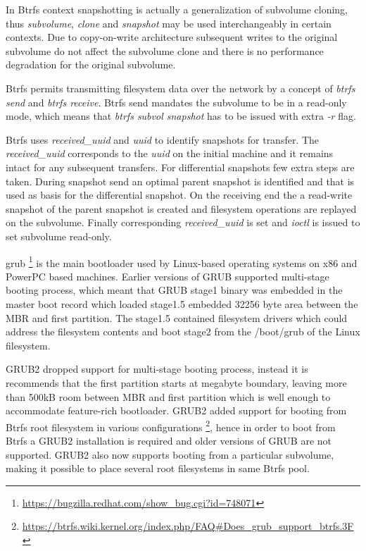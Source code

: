 \documentclass[a4paper,11pt]{kth-mag}
\begin{document}
In Btrfs context snapshotting is actually 
a generalization of subvolume cloning,
thus \emph{subvolume}, \emph{clone} and \emph{snapshot} may be used
interchangeably in certain contexts.
Due to copy-on-write architecture subsequent writes
to the original subvolume do not affect
the subvolume clone and there is no performance
degradation for the original subvolume.

Btrfs permits transmitting filesystem data over the network
by a concept of \emph{btrfs send} and \emph{btrfs receive}.
Btrfs send mandates the subvolume to be in a read-only mode,
which means that \emph{btrfs subvol snapshot} has to be issued
with extra \emph{-r} flag.


Btrfs uses \emph{received\_uuid} and \emph{uuid} to
identify snapshots for transfer.
The \emph{received\_uuid} corresponds to the \emph{uuid} on
the initial machine and it remains intact for any subsequent transfers.
For differential snapshots few extra steps are taken.
During snapshot send an optimal parent snapshot is
identified and that is used as basis for the differential snapshot.
On the receiving end the a read-write snapshot of the parent
snapshot is created and filesystem operations
are replayed on the subvolume.
Finally corresponding \emph{received\_uuid} is set and
\emph{ioctl} is issued to set subvolume read-only.


\gls{grub}
\footnote{\url{https://bugzilla.redhat.com/show_bug.cgi?id=748071}}
is the main bootloader used
by Linux-based operating systems on x86 and PowerPC based machines.
Earlier versions of GRUB supported multi-stage booting process,
which meant that GRUB stage1 binary was embedded in the
master boot record which loaded stage1.5 embedded
32256 byte area between the MBR and first partition.
The stage1.5 contained filesystem drivers which could
address the filesystem contents and boot stage2 from
the /boot/grub of the Linux filesystem.

GRUB2 dropped support for multi-stage booting process,
instead it is recommends that the first partition
starts at megabyte boundary, leaving
more than 500kB room between MBR
and first partition which is well enough to accommodate
feature-rich bootloader.
GRUB2 added support for booting from Btrfs root filesystem
in various configurations
\footnote{\url{https://btrfs.wiki.kernel.org/index.php/FAQ\#Does_grub_support_btrfs.3F}},
hence in order to boot from
Btrfs a GRUB2 installation is required and older versions of
GRUB are not supported.
GRUB2 also now supports booting from a particular subvolume,
making it possible to place several root filesystems
in same Btrfs pool.
\end{document}
